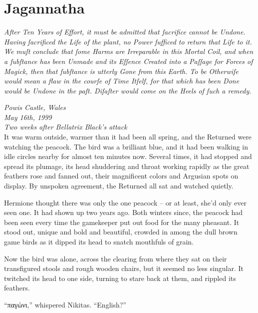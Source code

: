 \hypertarget{jagannatha}{%
\chapter{Jagannatha}\label{jagannatha}}

\emph{After Ten Years of Effort, it must be admitted that ſacrifice
cannot be Undone. Having ſacrificed the Life of the plant, no Power
ſufficed to return that Life to it. We muſt conclude that ſome Harms are
Irreparable in this Mortal Coil, and when a ſubſtance has been Unmade
and its Eſſence Created into a Paſſage for Forces of Magick, then that
ſubſtance is utterly Gone from this Earth. To be Otherwiſe would mean a
flaw in the courſe of Time Itſelf, for that which has been Done would be
Undone in the paſt. Diſaſter would come on the Heels of ſuch a
remedy.}\\


\mybreak

\emph{Powis Castle, Wales}\\
\emph{May 16th, 1999}\\
\emph{Two weeks after Bellatrix Black's attack}\\

It was warm outside, warmer than it had been all spring, and the
Returned were watching the peacock. The bird was a brilliant blue, and
it had been walking in idle circles nearby for almost ten minutes now.
Several times, it had stopped and spread its plumage, its head
shuddering and throat working rapidly as the great feathers rose and
fanned out, their magnificent colors and Argusian spots on display. By
unspoken agreement, the Returned all sat and watched quietly.

Hermione thought there was only the one peacock -- or at least, she'd
only ever seen one. It had shown up two years ago. Both winters since,
the peacock had been seen every time the gamekeeper put out food for the
many pheasant. It stood out, unique and bold and beautiful, crowded in
among the dull brown game birds as it dipped its head to snatch
mouthfuls of grain.

Now the bird was alone, across the clearing from where they sat on their
transfigured stools and rough wooden chairs, but it seemed no less
singular. It twitched its head to one side, turning to stare back at
them, and rippled its feathers.

``\foreignlanguage{greek}{\textgreek{παγώνι}},'' whispered Nikitas.
``English?''

